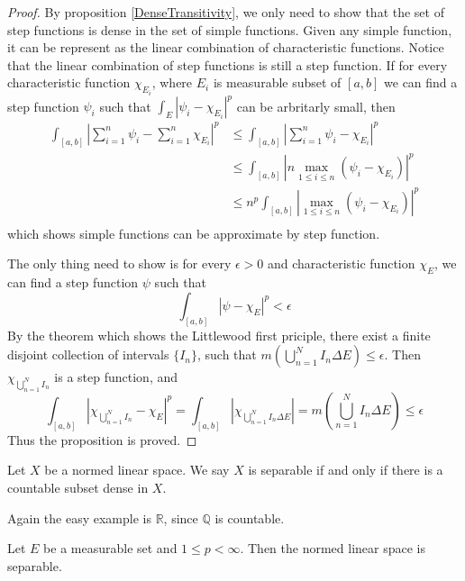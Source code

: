 \documentclass[lang=en, 12pt]{elegantbook}
\newcommand{\RR}{\mathbb{R}}
\newcommand{\QQ}{\mathbb{Q}}
\begin{document}
        \begin{proof}
            By proposition \ref{DenseTransitivity}, we only need to show that the set of step functions
        is dense in the set of simple functions.
            Given any simple function, it can be represent as the linear combination of 
        characteristic functions. Notice that the linear combination of step functions 
        is still a step function. If for every characteristic function $\chi_{E_i}$, where 
        $E_i$ is measurable subset of $[a,b]$
        we can find a step function $\psi_i$ such that $\int_E|\psi_i -\chi_{E_i}|^p$ can be 
        arbritarly small, then 
        \begin{equation*}
            \begin{aligned}
            \int_{[a,b]} |\sum_{i=1}^n \psi_i - \sum_{i=1}^n \chi_{E_i}|^p &\leq 
            \int_{[a,b]} |\sum_{i=1}^n \psi_i -\chi_{E_i}|^p \\
            &\leq \int_{[a,b]} |n\max_{1\leq i \leq n}(\psi_i -\chi_{E_i})|^p \\
            &\leq n^p\int_{[a,b]} |\max_{1\leq i \leq n}(\psi_i -\chi_{E_i})|^p \\
            \end{aligned}
        \end{equation*}
        which shows simple functions can be approximate by step function. \par 
            The only thing need to show is for every $\epsilon >0$ 
        and characteristic function $\chi_{E}$, we can find a step function $\psi$ 
        such that $$\int_{[a,b]}|\psi -\chi_{E}|^p< \epsilon$$
        By the theorem which shows the Littlewood first priciple, there exist 
        a finite disjoint collection of intervals $\{I_n\}$, such that 
        $m(\bigcup_{n=1}^N I_n \Delta E) \leq \epsilon$. Then 
        $\chi_{\bigcup_{n=1}^N I_n}$ is a step function, and 
        $$\int_{[a,b]} |\chi_{\bigcup_{n=1}^N I_n} - \chi_E |^p= 
        \int_{[a,b]} |\chi_{\bigcup_{n=1}^N I_n \Delta E}| = m(\bigcup_{n=1}^N I_n \Delta E) \leq \epsilon $$
        Thus the proposition is proved.
        \end{proof}
        \begin{definition}[Separability]
            Let $X$ be a normed linear space. We say $X$ is separable if and only if 
        there is a countable subset dense in $X$.
        \end{definition}
        Again the easy example is $\RR$, since $\QQ$ is countable. 
        \begin{theorem}
            Let $E$ be a measurable set and $1\leq p < \infty$. Then the normed linear space is 
        separable.
        \end{theorem}
\end{document}
